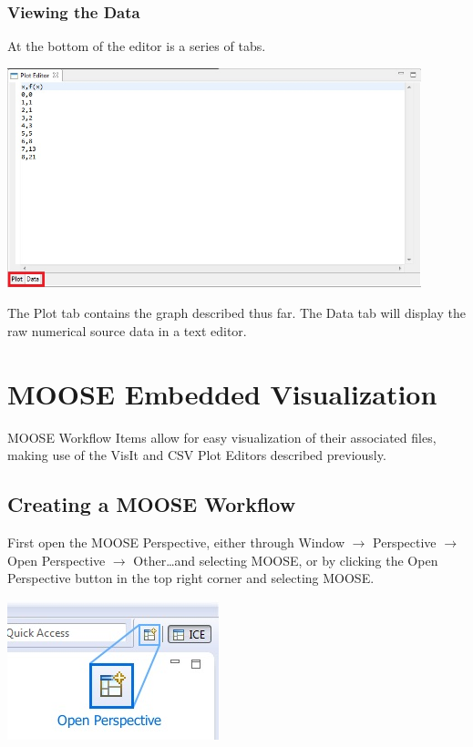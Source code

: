 \subsubsection{Viewing the Data}

At the bottom of the editor is a series of tabs.

\begin{center}
\includegraphics[width=12cm]{images/CSVTabs}
\end{center}

The Plot tab contains the graph described thus far. The Data tab will display
the raw numerical source data in a text editor. 

\section{MOOSE Embedded Visualization}

MOOSE Workflow Items allow for easy visualization of their associated files,
making use of the VisIt and CSV Plot Editors described previously.

\subsection{Creating a MOOSE Workflow}

First open the MOOSE Perspective, either through Window $\rightarrow$
Perspective $\rightarrow$ Open Perspective $\rightarrow$ Other\ldots and
selecting MOOSE, or by clicking the Open Perspective button in the top right
corner and selecting MOOSE.

\begin{center}
\includegraphics{images/ICE_OpenPerspective}
\end{center}

